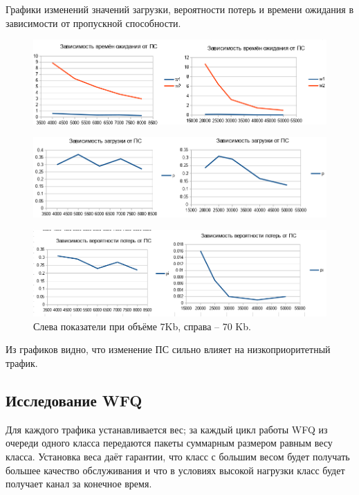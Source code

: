 \documentclass[12pt, a4paper] {ncc}
\begin{document}
		\newpage
		Графики изменений значений загрузки, вероятности потерь и времени ожидания в зависимости от
        пропускной способности.
		\begin{figure}[h!]
			\includegraphics[scale=0.4]{./img/pq_cmp1.png}
		\end{figure}
		\begin{figure}[h!]
			\includegraphics[scale=0.4]{./img/pq_cmp2.png}
		\end{figure}
		\begin{figure}[h!]
			\includegraphics[scale=0.4]{./img/pq_cmp3.png}
			\caption{Слева показатели при объёме 7Kb, справа -- 70 Kb.}
		\end{figure}

		Из графиков видно, что изменение ПС сильно влияет на низкоприоритетный трафик. 


	\subsection*{Исследование WFQ}

        Для каждого трафика устанавливается вес; за каждый цикл работы WFQ из очереди одного класса передаются пакеты
        суммарным размером равным весу класса. Установка веса даёт гарантии, что класс с большим весом будет получать
        большее качество обслуживания и что в условиях высокой нагрузки класс будет получает канал за конечное время.
\end{document}
